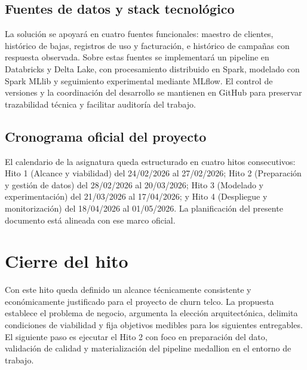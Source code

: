 ﻿\documentclass[12pt,a4paper]{article}
\begin{document}
\subsection{Fuentes de datos y stack tecnológico}

La solución se apoyará en cuatro fuentes funcionales: maestro de clientes, histórico de bajas, registros de uso y facturación, e histórico de campañas con respuesta observada. Sobre estas fuentes se implementará un pipeline en Databricks y Delta Lake, con procesamiento distribuido en Spark, modelado con Spark MLlib y seguimiento experimental mediante MLflow. El control de versiones y la coordinación del desarrollo se mantienen en GitHub para preservar trazabilidad técnica y facilitar auditoría del trabajo.

\subsection{Cronograma oficial del proyecto}

El calendario de la asignatura queda estructurado en cuatro hitos consecutivos: Hito 1 (Alcance y viabilidad) del 24/02/2026 al 27/02/2026; Hito 2 (Preparación y gestión de datos) del 28/02/2026 al 20/03/2026; Hito 3 (Modelado y experimentación) del 21/03/2026 al 17/04/2026; y Hito 4 (Despliegue y monitorización) del 18/04/2026 al 01/05/2026. La planificación del presente documento está alineada con ese marco oficial.

\section{Cierre del hito}

Con este hito queda definido un alcance técnicamente consistente y económicamente justificado para el proyecto de churn telco. La propuesta establece el problema de negocio, argumenta la elección arquitectónica, delimita condiciones de viabilidad y fija objetivos medibles para los siguientes entregables. El siguiente paso es ejecutar el Hito 2 con foco en preparación del dato, validación de calidad y materialización del pipeline medallion en el entorno de trabajo.
\end{document}
